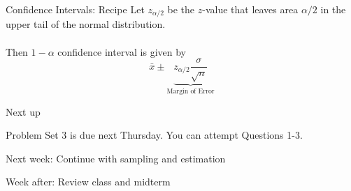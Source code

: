 \documentclass{./../div_teaching_slides}
\begin{document}
\begin{frame}{Confidence Intervals: Recipe}
Let $z_{\alpha/2}$ be the $z$-value that leaves area $\alpha/2$ in the upper tail of the normal distribution. \\~\\
Then $1-\alpha$ confidence interval is given by 
$$ \bar{x} \pm  \underbrace{z_{\alpha/2}  \frac{\sigma}{\sqrt{n}}}_{\text{Margin of Error}} $$
\end{frame}

\begin{frame}{Next up}
\begin{witemize}
  \item Problem Set 3 is due next Thursday. You can attempt Questions 1-3.  
  \item Next week: Continue with sampling and estimation
  \item Week after: Review class and midterm 
\end{witemize}
\end{frame}
\end{document}

